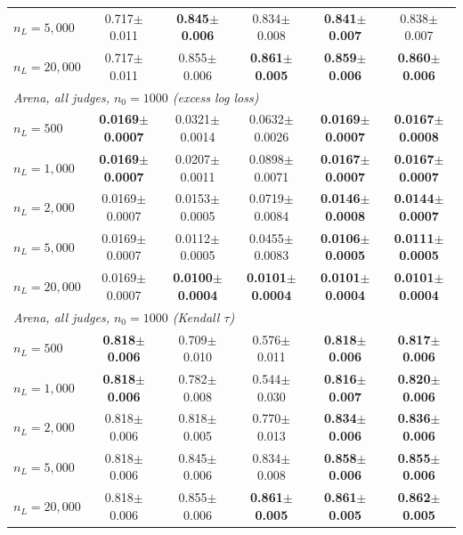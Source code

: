 \begin{table}[!t]
{\begin{tabular}{lccccc}
\quad $n_L=5,000$ & 0.717{\scriptsize$\pm$0.011} & \textbf{0.845{\scriptsize$\pm$0.006}} & 0.834{\scriptsize$\pm$0.008} & \textbf{0.841{\scriptsize$\pm$0.007}} & 0.838{\scriptsize$\pm$0.007} \\
\quad $n_L=20,000$ & 0.717{\scriptsize$\pm$0.011} & 0.855{\scriptsize$\pm$0.006} & \textbf{0.861{\scriptsize$\pm$0.005}} & \textbf{0.859{\scriptsize$\pm$0.006}} & \textbf{0.860{\scriptsize$\pm$0.006}} \\
\midrule
\multicolumn{6}{l}{\emph{Arena, all judges, $n_0=1000$ (excess log loss)}} \\
\quad $n_L=500$ & \textbf{0.0169{\scriptsize$\pm$0.0007}} & 0.0321{\scriptsize$\pm$0.0014} & 0.0632{\scriptsize$\pm$0.0026} & \textbf{0.0169{\scriptsize$\pm$0.0007}} & \textbf{0.0167{\scriptsize$\pm$0.0008}} \\
\quad $n_L=1,000$ & \textbf{0.0169{\scriptsize$\pm$0.0007}} & 0.0207{\scriptsize$\pm$0.0011} & 0.0898{\scriptsize$\pm$0.0071} & \textbf{0.0167{\scriptsize$\pm$0.0007}} & \textbf{0.0167{\scriptsize$\pm$0.0007}} \\
\quad $n_L=2,000$ & 0.0169{\scriptsize$\pm$0.0007} & 0.0153{\scriptsize$\pm$0.0005} & 0.0719{\scriptsize$\pm$0.0084} & \textbf{0.0146{\scriptsize$\pm$0.0008}} & \textbf{0.0144{\scriptsize$\pm$0.0007}} \\
\quad $n_L=5,000$ & 0.0169{\scriptsize$\pm$0.0007} & 0.0112{\scriptsize$\pm$0.0005} & 0.0455{\scriptsize$\pm$0.0083} & \textbf{0.0106{\scriptsize$\pm$0.0005}} & \textbf{0.0111{\scriptsize$\pm$0.0005}} \\
\quad $n_L=20,000$ & 0.0169{\scriptsize$\pm$0.0007} & \textbf{0.0100{\scriptsize$\pm$0.0004}} & \textbf{0.0101{\scriptsize$\pm$0.0004}} & \textbf{0.0101{\scriptsize$\pm$0.0004}} & \textbf{0.0101{\scriptsize$\pm$0.0004}} \\
\midrule
\multicolumn{6}{l}{\emph{Arena, all judges, $n_0=1000$ (Kendall $\tau$)}} \\
\quad $n_L=500$ & \textbf{0.818{\scriptsize$\pm$0.006}} & 0.709{\scriptsize$\pm$0.010} & 0.576{\scriptsize$\pm$0.011} & \textbf{0.818{\scriptsize$\pm$0.006}} & \textbf{0.817{\scriptsize$\pm$0.006}} \\
\quad $n_L=1,000$ & \textbf{0.818{\scriptsize$\pm$0.006}} & 0.782{\scriptsize$\pm$0.008} & 0.544{\scriptsize$\pm$0.030} & \textbf{0.816{\scriptsize$\pm$0.007}} & \textbf{0.820{\scriptsize$\pm$0.006}} \\
\quad $n_L=2,000$ & 0.818{\scriptsize$\pm$0.006} & 0.818{\scriptsize$\pm$0.005} & 0.770{\scriptsize$\pm$0.013} & \textbf{0.834{\scriptsize$\pm$0.006}} & \textbf{0.836{\scriptsize$\pm$0.006}} \\
\quad $n_L=5,000$ & 0.818{\scriptsize$\pm$0.006} & 0.845{\scriptsize$\pm$0.006} & 0.834{\scriptsize$\pm$0.008} & \textbf{0.858{\scriptsize$\pm$0.006}} & \textbf{0.855{\scriptsize$\pm$0.006}} \\
\quad $n_L=20,000$ & 0.818{\scriptsize$\pm$0.006} & 0.855{\scriptsize$\pm$0.006} & \textbf{0.861{\scriptsize$\pm$0.005}} & \textbf{0.861{\scriptsize$\pm$0.005}} & \textbf{0.862{\scriptsize$\pm$0.005}} \\
\bottomrule
\end{tabular}}
\end{table}
